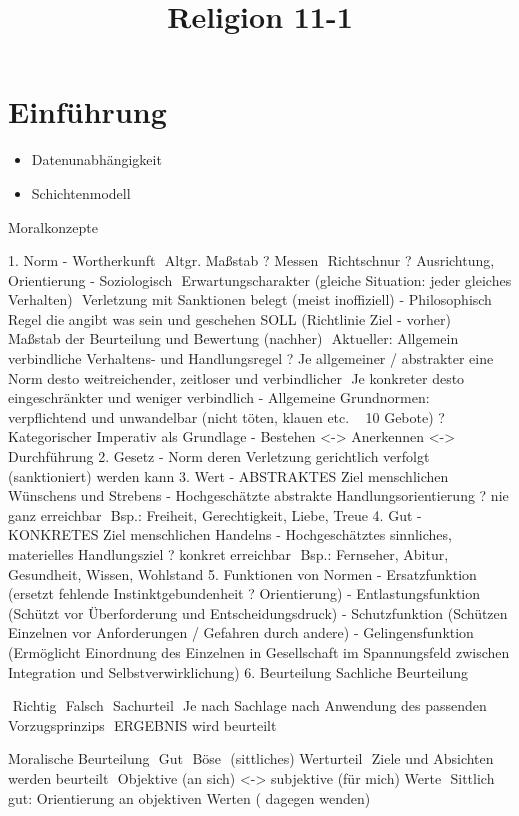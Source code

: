 \documentclass[11pt, paper=a4, twocolumn]{scrartcl}
\title{\vspace{-1.25cm}Religion 11-1\vspace{-0.25cm}}
\date{\vspace{-5ex}}
\begin{document}
	\maketitle


	\section{Einführung}
		\begin{itemize}
			\item Datenunabhängigkeit
			\item Schichtenmodell
		\end{itemize}




Moralkonzepte

1.	Norm
-	Wortherkunft
	Altgr. Maßstab ? Messen
	Richtschnur ? Ausrichtung, Orientierung
-	Soziologisch
	Erwartungscharakter (gleiche Situation: jeder gleiches Verhalten)
	Verletzung mit Sanktionen belegt (meist inoffiziell)
-	Philosophisch
	Regel die angibt was sein und geschehen SOLL (Richtlinie Ziel - vorher)
	Maßstab der Beurteilung und Bewertung (nachher)
	Aktueller: Allgemein verbindliche Verhaltens- und Handlungsregel
? Je allgemeiner / abstrakter eine Norm desto weitreichender, zeitloser und verbindlicher  Je konkreter desto eingeschränkter und weniger verbindlich
-	Allgemeine Grundnormen: verpflichtend und unwandelbar
(nicht töten, klauen etc. ~ 10 Gebote) ? Kategorischer Imperativ als Grundlage
-	Bestehen <-> Anerkennen <-> Durchführung
2.	Gesetz
-	Norm deren Verletzung gerichtlich verfolgt (sanktioniert) werden kann
3.	Wert
-	ABSTRAKTES Ziel menschlichen Wünschens und Strebens
-	Hochgeschätzte abstrakte Handlungsorientierung ? nie ganz erreichbar
	Bsp.: Freiheit, Gerechtigkeit, Liebe, Treue
4.	Gut
-	KONKRETES Ziel menschlichen Handelns
-	Hochgeschätztes sinnliches, materielles Handlungsziel ? konkret erreichbar
	Bsp.: Fernseher, Abitur, Gesundheit, Wissen, Wohlstand
5.	Funktionen von Normen
-	Ersatzfunktion (ersetzt fehlende Instinktgebundenheit ? Orientierung)
-	Entlastungsfunktion (Schützt vor Überforderung und Entscheidungsdruck)
-	Schutzfunktion (Schützen Einzelnen vor Anforderungen / Gefahren durch andere)
-	Gelingensfunktion (Ermöglicht Einordnung des Einzelnen in Gesellschaft im Spannungsfeld zwischen Integration und Selbstverwirklichung)
6.	Beurteilung 
Sachliche Beurteilung

	Richtig  Falsch
	Sachurteil
	Je nach Sachlage nach Anwendung des passenden Vorzugsprinzips
	ERGEBNIS wird beurteilt

Moralische Beurteilung
	Gut  Böse
	(sittliches) Werturteil
	Ziele und Absichten werden beurteilt
	Objektive (an sich) <-> subjektive (für mich) Werte
	Sittlich gut: Orientierung an objektiven Werten ( dagegen wenden)
\end{document}
